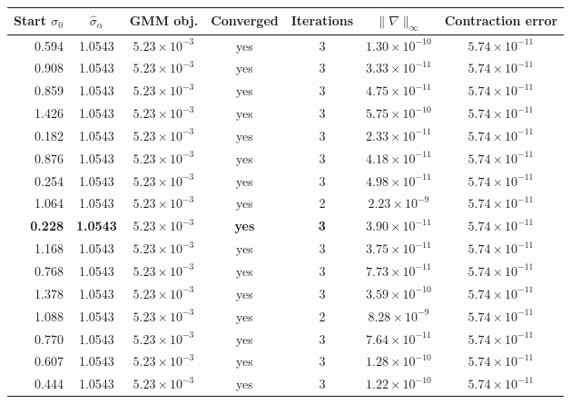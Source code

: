 \begin{tabular}{rcccccc}
\toprule
Start $\sigma_0$ & $\hat\sigma_\alpha$ & GMM obj. & Converged & Iterations & $\|\nabla\|_\infty$ & Contraction error \\
\midrule
0.594 & 1.0543 & $5.23\times10^{-3}$ & yes & 3 & $1.30\times10^{-10}$ & $5.74\times10^{-11}$ \\
0.908 & 1.0543 & $5.23\times10^{-3}$ & yes & 3 & $3.33\times10^{-11}$ & $5.74\times10^{-11}$ \\
0.859 & 1.0543 & $5.23\times10^{-3}$ & yes & 3 & $4.75\times10^{-11}$ & $5.74\times10^{-11}$ \\
1.426 & 1.0543 & $5.23\times10^{-3}$ & yes & 3 & $5.75\times10^{-10}$ & $5.74\times10^{-11}$ \\
0.182 & 1.0543 & $5.23\times10^{-3}$ & yes & 3 & $2.33\times10^{-11}$ & $5.74\times10^{-11}$ \\
0.876 & 1.0543 & $5.23\times10^{-3}$ & yes & 3 & $4.18\times10^{-11}$ & $5.74\times10^{-11}$ \\
0.254 & 1.0543 & $5.23\times10^{-3}$ & yes & 3 & $4.98\times10^{-11}$ & $5.74\times10^{-11}$ \\
1.064 & 1.0543 & $5.23\times10^{-3}$ & yes & 2 & $2.23\times10^{-9}$ & $5.74\times10^{-11}$ \\
\textbf{0.228} & \textbf{1.0543} & \textbf{$5.23\times10^{-3}$} & \textbf{yes} & \textbf{3} & \textbf{$3.90\times10^{-11}$} & \textbf{$5.74\times10^{-11}$} \\
1.168 & 1.0543 & $5.23\times10^{-3}$ & yes & 3 & $3.75\times10^{-11}$ & $5.74\times10^{-11}$ \\
0.768 & 1.0543 & $5.23\times10^{-3}$ & yes & 3 & $7.73\times10^{-11}$ & $5.74\times10^{-11}$ \\
1.378 & 1.0543 & $5.23\times10^{-3}$ & yes & 3 & $3.59\times10^{-10}$ & $5.74\times10^{-11}$ \\
1.088 & 1.0543 & $5.23\times10^{-3}$ & yes & 2 & $8.28\times10^{-9}$ & $5.74\times10^{-11}$ \\
0.770 & 1.0543 & $5.23\times10^{-3}$ & yes & 3 & $7.64\times10^{-11}$ & $5.74\times10^{-11}$ \\
0.607 & 1.0543 & $5.23\times10^{-3}$ & yes & 3 & $1.28\times10^{-10}$ & $5.74\times10^{-11}$ \\
0.444 & 1.0543 & $5.23\times10^{-3}$ & yes & 3 & $1.22\times10^{-10}$ & $5.74\times10^{-11}$ \\
\bottomrule
\end{tabular}
